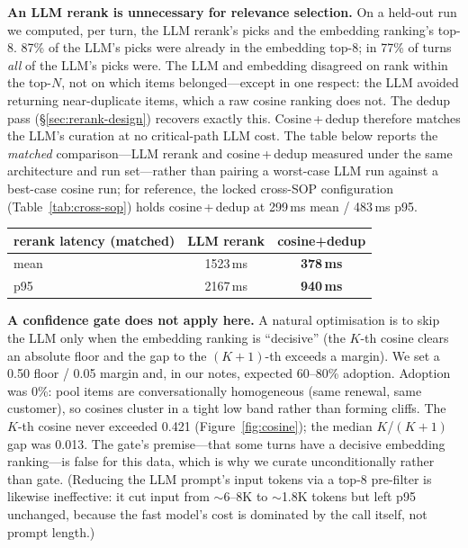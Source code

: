 \documentclass[10pt,twocolumn]{article}
\begin{document}
\textbf{An LLM rerank is unnecessary for relevance selection.} On a held-out run we computed, per turn, the LLM rerank's picks and the embedding ranking's top-8. 87\% of the LLM's picks were already in the embedding top-8; in 77\% of turns \emph{all} of the LLM's picks were. The LLM and embedding disagreed on rank within the top-$N$, not on which items belonged---except in one respect: the LLM avoided returning near-duplicate items, which a raw cosine ranking does not. The dedup pass (\S\ref{sec:rerank-design}) recovers exactly this. Cosine\,+\,dedup therefore matches the LLM's curation at no critical-path LLM cost. The table below reports the \emph{matched} comparison---LLM rerank and cosine\,+\,dedup measured under the same architecture and run set---rather than pairing a worst-case LLM run against a best-case cosine run; for reference, the locked cross-SOP configuration (Table~\ref{tab:cross-sop}) holds cosine\,+\,dedup at 299\,ms mean / 483\,ms p95.

\begin{center}\footnotesize\setlength{\tabcolsep}{4pt}
\begin{tabular}{lcc}
\toprule
rerank latency (matched) & LLM rerank & cosine+dedup \\
\midrule
mean & 1523\,ms & \textbf{378\,ms} \\
p95 & 2167\,ms & \textbf{940\,ms} \\
\bottomrule
\end{tabular}
\end{center}

\textbf{A confidence gate does not apply here.} A natural optimisation is to skip the LLM only when the embedding ranking is ``decisive'' (the $K$-th cosine clears an absolute floor and the gap to the $(K{+}1)$-th exceeds a margin). We set a 0.50 floor / 0.05 margin and, in our notes, expected 60--80\% adoption. Adoption was 0\%: pool items are conversationally homogeneous (same renewal, same customer), so cosines cluster in a tight low band rather than forming cliffs. The $K$-th cosine never exceeded 0.421 (Figure~\ref{fig:cosine}); the median $K$/$(K{+}1)$ gap was 0.013. The gate's premise---that some turns have a decisive embedding ranking---is false for this data, which is why we curate unconditionally rather than gate. (Reducing the LLM prompt's input tokens via a top-8 pre-filter is likewise ineffective: it cut input from $\sim$6--8K to $\sim$1.8K tokens but left p95 unchanged, because the fast model's cost is dominated by the call itself, not prompt length.)
\end{document}
